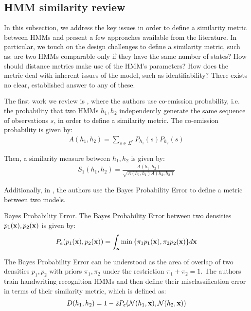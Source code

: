 \documentclass[../main.tex]{subfiles}
\begin{document}
\subsection{HMM similarity review} \label{subsection_hmmsimreview}
In this subsection, we address the key issues in order to define a similarity metric between HMMs and present a few approaches available from the literature. In particular, we touch on the design challenges to define a similarity metric, such as: are two HMMs comparable only if they have the same number of states? How should distance metrics make use of the HMM's parameters? How does the metric deal with inherent issues of the model, such as identifiability? There exists no clear, established answer to any of these.
\par The first work we review is \cite{Lyngs1999}, where the authors use co-emission probability, i.e. the probability that two HMMs $h_1, h_2$ independently generate the same sequence of observations $s$, in order to define a similarity metric. The co-emission probability is given by:
\begin{align*}
A(h_1, h_2) = \sum_{s\in \Sigma^*}P_{h_1}(s)P_{h_2}(s)
\end{align*}
\par Then, a similarity measure between $h_1, h_2$ is given by:
\begin{align*}
S_1(h_1, h_2) = \frac{A(h_1, h_2)}{\sqrt{A(h_1, h_1)A(h_2, h_2)}}
\end{align*}
\par Additionally, in \cite{Bahlmann2001}, the authors use the Bayes Probability Error to define a metric between two models. 
\begin{definition}{Bayes Probability Error.} \label{def_bpe}
The Bayes Probability Error between two densities $p_1(\mathbf{x}), p_2(\mathbf{x})$ is given by:
\begin{align*}
P_e(p_1(\mathbf{x}), p_2(\mathbf{x})) = \int_{\mathbf{x}}\min{\{\pi_1p_1(\mathbf{x}), \pi_2p_2(\mathbf{x})\}}d\mathbf{x}
\end{align*}
\end{definition}
\par The Bayes Probability Error can be understood as the area of overlap of two densities $p_1, p_2$ with priors $\pi_1, \pi_2$ under the restriction $\pi_1+\pi_2 = 1$. The authors train handwriting recognition HMMs and then define their misclassification error in terms of their similarity metric, which is defined as:
\begin{align*}
D(h_1, h_2) = 1 - 2P_e{(\mathcal{N}(h_1, \mathbf{x}), \mathcal{N}(h_2, \mathbf{x}))}
\end{align*}
\end{document}
